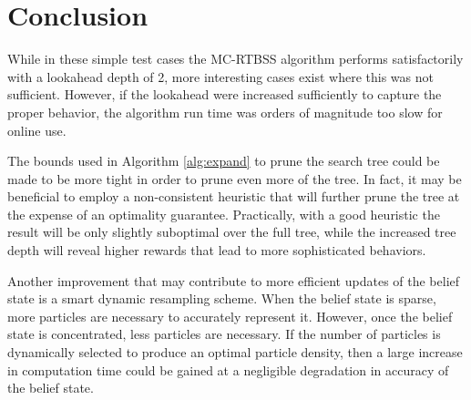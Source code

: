 \section{Conclusion}

While in these simple test cases the MC-RTBSS algorithm performs satisfactorily with a lookahead depth of 2, more interesting cases exist where this was not sufficient.  However, if the lookahead were increased sufficiently to capture the proper behavior, the algorithm run time was orders of magnitude too slow for online use.  

The bounds used in Algorithm \ref{alg:expand} to prune the search tree could be made to be more tight in order to prune even more of the tree.  In fact, it may be beneficial to employ a non-consistent heuristic that will further prune the tree at the expense of an optimality guarantee.  Practically, with a good heuristic the result will be only slightly suboptimal over the full tree, while the increased tree depth will reveal higher rewards that lead to more sophisticated behaviors.

Another improvement that may contribute to more efficient updates of the belief state is a smart dynamic resampling scheme.  When the belief state is sparse, more particles are necessary to accurately represent it.  However, once the belief state is concentrated, less particles are necessary.  If the number of particles is dynamically selected to produce an optimal particle density, then a large increase in computation time could be gained at a negligible degradation in accuracy of the belief state.